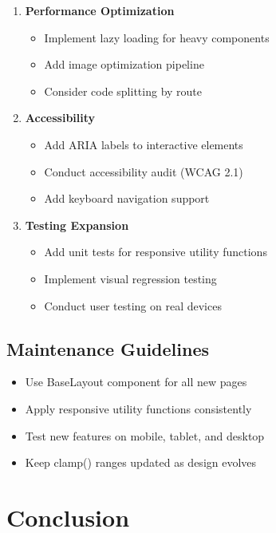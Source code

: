 \documentclass[11pt, a4paper]{report}
\begin{document}
\begin{enumerate}
    \item \textbf{Performance Optimization}
        \begin{itemize}
            \item Implement lazy loading for heavy components
            \item Add image optimization pipeline
            \item Consider code splitting by route
        \end{itemize}
    
    \item \textbf{Accessibility}
        \begin{itemize}
            \item Add ARIA labels to interactive elements
            \item Conduct accessibility audit (WCAG 2.1)
            \item Add keyboard navigation support
        \end{itemize}
    
    \item \textbf{Testing Expansion}
        \begin{itemize}
            \item Add unit tests for responsive utility functions
            \item Implement visual regression testing
            \item Conduct user testing on real devices
        \end{itemize}
\end{enumerate}

\section{Maintenance Guidelines}

\begin{itemize}
    \item Use BaseLayout component for all new pages
    \item Apply responsive utility functions consistently
    \item Test new features on mobile, tablet, and desktop
    \item Keep clamp() ranges updated as design evolves
\end{itemize}

\chapter{Conclusion}
\end{document}
